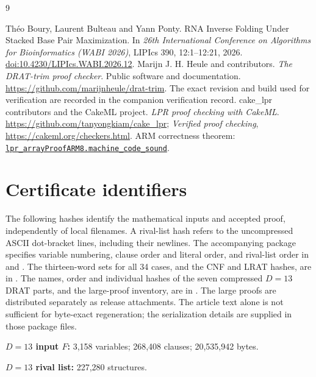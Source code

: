 \documentclass[11pt,a4paper]{article}
\theoremstyle{definition}
\begin{document}
\begin{thebibliography}{9}
\raggedright
{}
Th\'eo Boury, Laurent Bulteau and Yann Ponty.
RNA Inverse Folding Under Stacked Base Pair Maximization.
In \emph{26th International Conference on Algorithms for Bioinformatics
(WABI 2026)}, LIPIcs 390, 12:1--12:21, 2026.
\href{https://doi.org/10.4230/LIPIcs.WABI.2026.12}{doi:10.4230/LIPIcs.WABI.2026.12}.
Marijn J. H. Heule and contributors.
\emph{The DRAT-trim proof checker}. Public software and documentation.
\url{https://github.com/marijnheule/drat-trim}.
The exact revision and build used for verification are recorded in the
companion verification record.
cake\_lpr contributors and the CakeML project.
\emph{LPR proof checking with CakeML}.
\url{https://github.com/tanyongkiam/cake_lpr};
\emph{Verified proof checking}, \url{https://cakeml.org/checkers.html}.
ARM correctness theorem:
\href{https://github.com/CakeML/cakeml/blob/fb377b4bb704497c921cde68ccc8da3b4f0e9132/examples/lpr_checker/array/compilation/proofsARM8/lpr_arrayProofARM8Script.sml}{\texttt{lpr\_arrayProofARM8.machine\_code\_sound}}.
\end{thebibliography}

\appendix
\section{Certificate identifiers}\label{app:cert}
The following hashes identify the mathematical inputs and accepted
proof, independently of local filenames. A rival-list hash refers to
the uncompressed ASCII dot-bracket lines, including their newlines.
The accompanying package specifies variable numbering, clause order and
literal order, and rival-list order in  and
. The thirteen-word sets for all 34 cases,
and the CNF and LRAT hashes, are in .
The names, order and individual hashes of the seven compressed $D=13$
DRAT parts, and the large-proof inventory, are in
. The large proofs are distributed separately
as release attachments. The article text alone is not sufficient for
byte-exact regeneration; the serialization details are supplied in those
package files.

\begingroup\small
\noindent\textbf{$D=13$ input $F$:} 3,158 variables; 268,408 clauses;
20,535,942 bytes.\\

\medskip\noindent\textbf{$D=13$ rival list:} 227,280 structures.\\
\end{document}
